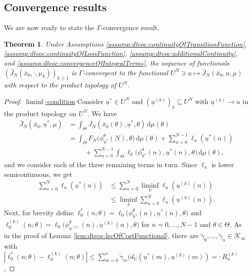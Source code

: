\documentclass[letterpaper, 10 pt, conference]{IEEEconf}  %
\newcommand{\diff}{\, \mathrm{d}} %
\newcommand{\cKi}{\mathcal{K}_\infty} %
\newcommand{\s}{\phi} %
\newcommand{\es}{\bar{x}} %
\newcommand{\is}[1]{{\underline{#1}}} %
\theoremstyle{theorem}
\newtheorem{theorem}{Theorem}
\theoremstyle{definition}
\theoremstyle{remark}
\begin{document}
\subsection{Convergence results}
We are now ready to state the $\Gamma$-convergence result.
\begin{theorem} \label{thm:dteoc:GammaConvergence}
Under Assumptions \ref{assump:dteoc:continuityOfTransitionFunction}, \ref{assump:dteoc:continuityOfLossFunction}, \ref{assump:dteoc:additionalContinuity}, and \ref{assump:dteoc:convergenceOfIntegralTerms}, 
the sequence of functionals $\left( \bar J_N(\bar x_0, \cdot, \mu_k) \right)_{k\geq 1}$ is $\Gamma$-convergent to the functional $U^N\ni u \mapsto \bar J_N(\bar x_0, u, \mu)$ with respect to the product topology of $U^N$.
\end{theorem}
\begin{proof}
\underline{$\liminf$-condition} Consider $\is{u}^\ast\in U^N$ and $(\is{u}^{(k)})_k\subseteq U^N$ with $\is{u}^{(k)}\rightarrow u$ in the product topology on $U^N$.
We have
\begin{align*}
    \bar J_N(\es_0,\is{u}^\ast,\mu) & = \int_{\Theta} J_N(\es_0(\theta),\is{u}^\ast,\theta) \diff \mu(\theta) \\
    & = \int_\Theta F_N\big( \s_{\is{u}^\ast}^\theta(N), \theta \big) \diff \mu(\theta) 
        + \sum_{n=0}^{N-1} \ell_u(\is{u}^\ast(n)) \\
        & \hspace{1cm} + \sum_{n=0}^{N-1} \int_\Theta \ell_0 \big( \s_{\is{u}^\ast}^\theta(n), \is{u}^\ast(n), \theta \big) \diff \mu(\theta),
\end{align*}
and we consider each of the three remaining terms in turn.
Since $\ell_u$ is lower semicontinuous, we get
\begin{align*}
    \sum_{n=0}^N \ell_u(\is{u}^\ast(n)) & \leq \sum_{n=0}^N \liminf_k \ell_u(\is{u}^{(k)}(n)) \\
        & \leq \liminf_k  \sum_{n=0}^N \ell_u(\is{u}^{(k)}(n)).
\end{align*}
Next, for brevity define 
$\ell_0^\ast(n;\theta) =  \ell_0 \big( \s_{\is{u}^\ast}^\theta(n), \is{u}^\ast(n), \theta \big)$ 
and 
$\ell_0^{(k)}(n;\theta) =  \ell_0 \big( \s_{\is{u}^{(k)}}^\theta(n), \is{u}^{(k)}(n), \theta \big) $ for $n=0,\ldots,N-1$ and $\theta\in\Theta$.
As in the proof of Lemma \ref{lem:dteoc:lscOfCostFunctional}, there are $\tilde \gamma_0,\ldots,\tilde \gamma_n\in\cKi$ with
$|\ell_0^\ast(n;\theta)-\ell_0^{(k)}(n;\theta)|\leq \sum_{m=0}^n \tilde \gamma_m(d_U(\is{u}^\ast(m), \is{u}^{(k)}(m)) =: R^{(k)}_n$,

\end{proof}
\end{document}
